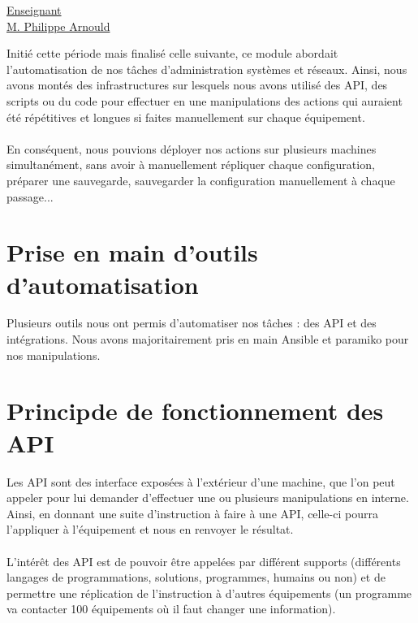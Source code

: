 \renewcommand{\figurename}{}

\vspace*{0.2cm}%
      \large
      \href{}{\color{black}Enseignant\\M. Philippe Arnould}\\%
      \normalsize
\vspace*{0.5cm}%



Initié cette période mais finalisé celle suivante, ce module abordait l'automatisation de nos tâches d'administration systèmes et réseaux. Ainsi, nous avons montés des infrastructures sur lesquels nous avons utilisé des API, des scripts ou du code pour effectuer en une manipulations des actions qui auraient été répétitives et longues si faites manuellement sur chaque équipement.
\\ \\
En conséquent, nous pouvions déployer nos actions sur plusieurs machines simultanément, sans avoir à manuellement répliquer chaque configuration, préparer une sauvegarde, sauvegarder la configuration manuellement à chaque passage...

\section{Prise en main d'outils d'automatisation}

Plusieurs outils nous ont permis d'automatiser nos tâches : des API et des intégrations. Nous avons majoritairement pris en main Ansible et paramiko pour nos manipulations.


\section{Principde de fonctionnement des API}

Les API sont des interface exposées à l'extérieur d'une machine, que l'on peut appeler pour lui demander d'effectuer une ou plusieurs manipulations en interne. Ainsi, en donnant une suite d'instruction à faire à une API, celle-ci pourra l'appliquer à l'équipement et nous en renvoyer le résultat.
\\ \\
L'intérêt des API est de pouvoir être appelées par différent supports (différents langages de programmations, solutions, programmes, humains ou non) et de permettre une réplication de l'instruction à d'autres équipements (un programme va contacter 100 équipements où il faut changer une information).

